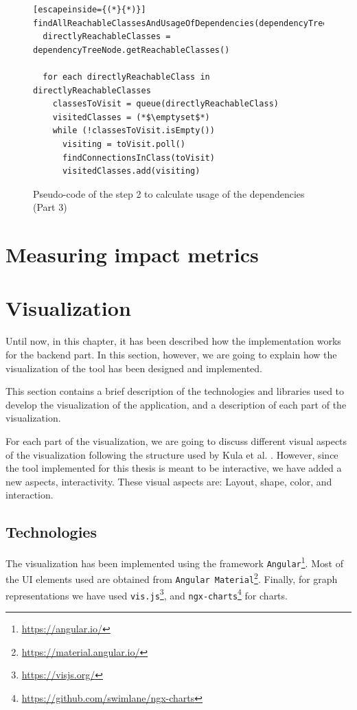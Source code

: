 \begin{figure}[ht!]
\begin{lstlisting}[escapeinside={(*}{*)}]
findAllReachableClassesAndUsageOfDependencies(dependencyTreeNode)
  directlyReachableClasses = dependencyTreeNode.getReachableClasses()

  for each directlyReachableClass in directlyReachableClasses
    classesToVisit = queue(directlyReachableClass)
    visitedClasses = (*$\emptyset$*)
    while (!classesToVisit.isEmpty())
      visiting = toVisit.poll()
      findConnectionsInClass(toVisit)
      visitedClasses.add(visiting)
\end{lstlisting}
\caption{Pseudo-code of the step 2 to calculate usage of the dependencies (Part 3)}
\label{fig:algorithm-usage-step2-3}
\end{figure}

\section{Measuring impact metrics}

\section{Visualization}
Until now, in this chapter, it has been described how the implementation works for the backend part. In this section, however, we are going to explain how the visualization of the tool has been designed and implemented.

This section contains a brief description of the technologies and libraries used to develop the visualization of the application, and a description of each part of the visualization.

For each part of the visualization, we are going to discuss different visual aspects of the visualization following the structure used by Kula et al. \cite{kula2014visualizing}. However, since the tool implemented for this thesis is meant to be interactive, we have added a new aspects, interactivity. These visual aspects are: Layout, shape, color, and interaction.

\subsection{Technologies}
The visualization has been implemented using the framework \texttt{Angular}\footnote{\url{https://angular.io/}}. Most of the UI elements used are obtained from \texttt{Angular Material}\footnote{\url{https://material.angular.io/}}. Finally, for graph representations we have used \texttt{vis.js}\footnote{\url{https://visjs.org/}}, and \texttt{ngx-charts}\footnote{\url{https://github.com/swimlane/ngx-charts}} for charts.

